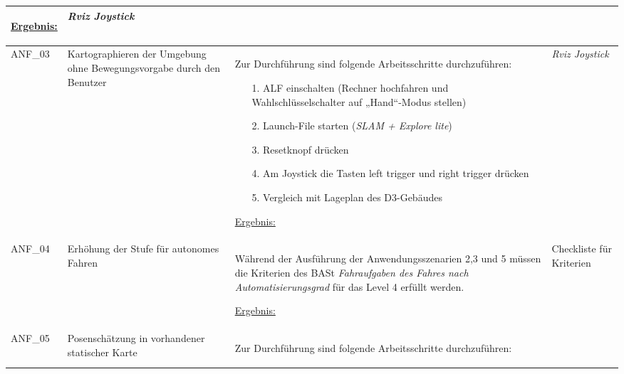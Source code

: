 \documentclass[12pt,a4paper,oneside,numbers=noenddot,captions=tableheading,toc=bibliography,openany,tikz,margin=5mm]{scrbook}
\begin{document}
\begin{longtable}{|p{}|p{}|p{7cm}|p{}|}
\begin{itemize}
	\end{itemize}
	
	\underline{Ergebnis:}\newline
   \newline
	
	\textbf{}%
	
	& \textit{Rviz \newline Joystick}\\
	\hline
	ANF\_03 & Kartographieren der Umgebung ohne Bewegungsvorgabe durch den Benutzer& Zur Durchführung sind folgende Arbeitsschritte durchzuführen:
	\begin{itemize}
		
		
		\item[1.]	ALF einschalten (Rechner hochfahren und Wahlschlüsselschalter auf „Hand“-Modus stellen)
		\item[2.]	Launch-File starten (\textit{SLAM + Explore lite})
		\item[3.]	Resetknopf drücken
		\item[4.]	Am Joystick die Tasten \glqq left trigger\grqq{} und \glqq right trigger\grqq{} drücken
		\item[5.]	Vergleich mit Lageplan des D3-Gebäudes
		
	\end{itemize}
	
	\underline{Ergebnis:}\newline
	\newline
	
	\textbf{}%
	
	& \textit{Rviz \newline Joystick}\\
	\hline
	ANF\_04 & Erhöhung der Stufe für autonomes Fahren & Während der Ausführung der Anwendungsszenarien 2,3 und 5 müssen die Kriterien des BASt \textit{Fahraufgaben des Fahres nach Automatisierungsgrad} für das Level 4 erfüllt werden. \newline
	
	\underline{Ergebnis:}\newline
	
	\textbf{} %
	& 	Checkliste für Kriterien
	\\
	\hline
	ANF\_05 & Posenschätzung in vorhandener statischer Karte & Zur Durchführung sind folgende Arbeitsschritte durchzuführen:
	\begin{itemize}
		

\end{itemize}
\end{longtable}
\end{document}

